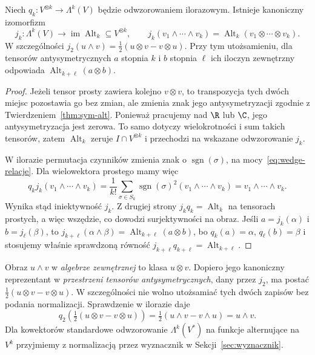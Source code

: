 \begin{twierdzenie}
\label{thm:wedge-alt}
Niech $q_k\colon V^{\otimes k}\to\Lambda^k(V)$ będzie odwzorowaniem
ilorazowym. Istnieje kanoniczny izomorfizm
\[
 j_k\colon\Lambda^k(V)\longrightarrow
 \operatorname{im}\operatorname{Alt}_k\subseteq V^{\otimes k},
 \qquad j_k(v_1\wedge\cdots\wedge v_k)
 =\operatorname{Alt}_k(v_1\otimes\cdots\otimes v_k).
\]
W szczególności $j_2(u\wedge v)=
\tfrac12(u\otimes v-v\otimes u)$. Przy tym utożsamieniu,
dla tensorów antysymetrycznych $a$ stopnia $k$ i $b$ stopnia
$\ell$ ich iloczyn zewnętrzny odpowiada
$\operatorname{Alt}_{k+\ell}(a\otimes b)$.
\end{twierdzenie}
\begin{proof}
Jeżeli tensor prosty zawiera kolejno $v\otimes v$, to
transpozycja tych dwóch miejsc pozostawia go bez zmian,
ale zmienia znak jego antysymetryzacji zgodnie z
Twierdzeniem~\ref{thm:sym-alt}. Ponieważ pracujemy nad
$\R$ lub $\C$, jego antysymetryzacja jest zerowa.
To samo dotyczy wielokrotności i sum takich tensorów,
zatem $\operatorname{Alt}_k$ zeruje $I\cap V^{\otimes k}$
i przechodzi na wskazane odwzorowanie $j_k$.

W ilorazie permutacja czynników zmienia znak o
$\operatorname{sgn}(\sigma)$, na mocy~\eqref{eq:wedge-relacje}.
Dla wielowektora prostego mamy więc
\[
 q_kj_k(v_1\wedge\cdots\wedge v_k)
 =\frac1{k!}\sum_{\sigma\in S_k}
 \operatorname{sgn}(\sigma)^2
 (v_1\wedge\cdots\wedge v_k)
 =v_1\wedge\cdots\wedge v_k.
\]
Wynika stąd iniektywność $j_k$. Z drugiej strony
$j_kq_k=\operatorname{Alt}_k$ na tensorach prostych,
a więc wszędzie, co dowodzi surjektywności na obraz.
Jeśli $a=j_k(\alpha)$ i $b=j_\ell(\beta)$, to
$j_{k+\ell}(\alpha\wedge\beta)
=\operatorname{Alt}_{k+\ell}(a\otimes b)$,
bo $q_k(a)=\alpha$, $q_\ell(b)=\beta$ i stosujemy właśnie
sprawdzoną równość $j_{k+\ell}q_{k+\ell}=\operatorname{Alt}_{k+\ell}$.
\end{proof}

\begin{uwaga}
\label{rem:normalizacja-wedge}
Obraz $u\wedge v$ w \emph{algebrze zewnętrznej} to klasa
$u\otimes v$. Dopiero jego kanoniczny reprezentant w
\emph{przestrzeni tensorów antysymetrycznych}, dany przez $j_2$,
ma postać $\tfrac12(u\otimes v-v\otimes u)$. W szczególności
nie wolno utożsamiać tych dwóch zapisów bez podania
normalizacji. Sprawdzenie w ilorazie daje
\[
 q_2\!\left(\tfrac12(u\otimes v-v\otimes u)\right)
 =\tfrac12(u\wedge v-v\wedge u)=u\wedge v.
\]
Dla kowektorów standardowe odwzorowanie
$\Lambda^k(V^*)$ na funkcje alternujące na $V^k$
przyjmiemy z normalizacją przez wyznacznik w
Sekcji~\ref{sec:wyznacznik}.
\end{uwaga}


